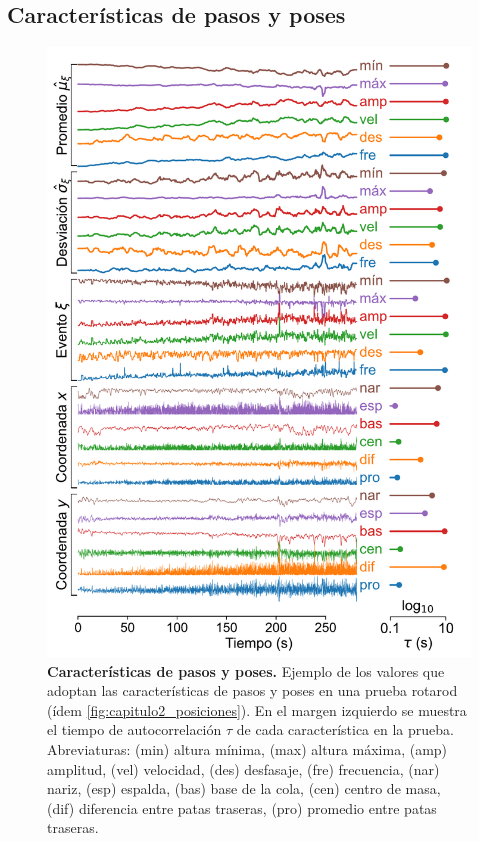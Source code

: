 \begin{appendix}
    \clearpage

    \section{Características de pasos y poses}\label{sec:apendice_pasos_poses}

    \begin{figure}[htbp]
        \centering
        \includegraphics[width=0.7\linewidth]{figuras/capitulo4/caracteristicas_pasos_poses.pdf}
        \caption{\textbf{Características de pasos y poses.}
            Ejemplo de los valores que adoptan las características de pasos y poses en una prueba rotarod (ídem \autoref{fig:capitulo2_posiciones}).
            En el margen izquierdo se muestra el tiempo de autocorrelación $\tau$ de cada característica en la prueba.
            Abreviaturas: (min) altura mínima, (max) altura máxima, (amp) amplitud, (vel) velocidad, (des) desfasaje, (fre) frecuencia,
            (nar) nariz, (esp) espalda, (bas) base de la cola, (cen) centro de masa, (dif) diferencia entre patas traseras, (pro) promedio entre patas traseras.}
        \label{fig:capitulo4_caracteristicas_pasos_poses}
    \end{figure}


\end{appendix}
